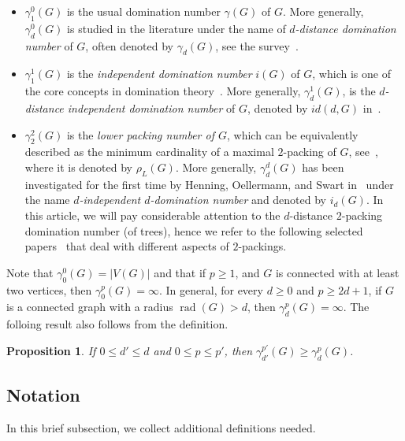 \documentclass[12pt]{article}
\newtheorem{proposition}[theorem]{Proposition}
\DeclareMathOperator{\rad}{rad}
\begin{document}
\begin{itemize}
\item $\gamma_1^0(G)$ is the usual domination number $\gamma(G)$ of $G$. More generally, $\gamma_d^0(G)$ is studied in the literature under the name of {\em $d$-distance domination number} of $G$, often denoted by $\gamma_d(G)$, see the survey~\cite{henning-2020}.
\item $\gamma_1^1(G)$ is the {\em independent domination number}  $i(G)$ of $G$, which is one of the core concepts in domination theory~\cite{Haynes-2023}. More generally, $\gamma_d^1(G)$, is the {\em $d$-distance independent domination number} of $G$, denoted by $id(d,G)$ in~\cite{Gimbel-1996, henning-2020}. 
\item $\gamma_2^2(G)$ is the {\em lower packing number of $G$}, which can be equivalently described as the minimum cardinality of a maximal $2$-packing of $G$, see~\cite{Henning-1998-1}, where it is denoted by $\rho_L(G)$. More generally, $\gamma_d^d(G)$ has been investigated for the first time by Henning, Oellermann, and Swart in~\cite{Henning1991} under the name {\em $d$-independent $d$-domination number} and denoted by $i_d(G)$. In this article, we will pay considerable attention to the $d$-distance $2$-packing domination number (of trees), hence we refer to the following selected papers~\cite{Bozovic-2022, Fisher-1994, Junosza-2012, Trejo-2023} that deal with different aspects of $2$-packings.  
\end{itemize}
Note that $\gamma_0^0(G) = |V(G)|$ and that if $p\ge 1$, and $G$ is connected with at least two vertices, then $\gamma_0^p(G) = \infty$. In general, for every $d \ge 0$ and $p \ge 2d+1$, if $G$ is a connected graph with a radius $\rad(G) >d$, then $\gamma_d^p(G) = \infty$. The folloing result also follows from the definition. 

\begin{proposition}
\label{prop:lower-bound-k-domination}
If $0 \leq d'\leq d$ and $0\le p\le p'$, then $\gamma_{d'}^{p'}(G) \geq \gamma_d^p(G)$.
\end{proposition}


\subsection{Notation}

In this brief subsection, we collect additional definitions needed.  
\end{document}
